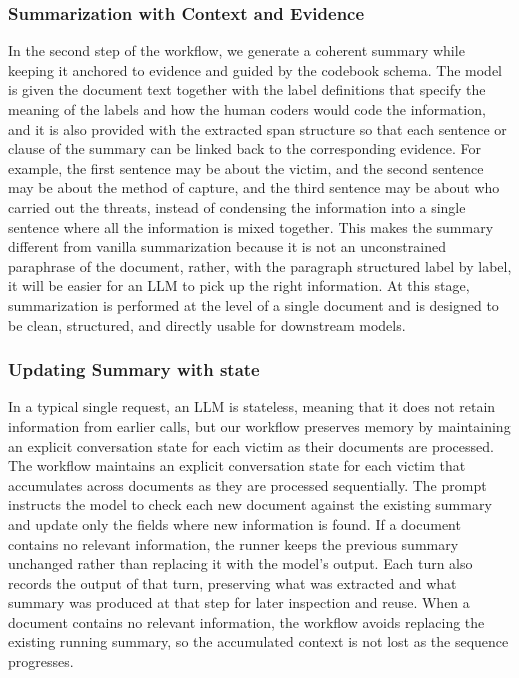 \documentclass{article}
\begin{document}
\subsubsection{Summarization with Context and
Evidence}\label{summarization-with-context-and-evidence}

In the second step of the workflow, we generate a coherent summary while
keeping it anchored to evidence and guided by the codebook schema. The
model is given the document text together with the label definitions
that specify the meaning of the labels and how the human coders would
code the information, and it is also provided with the extracted span
structure so that each sentence or clause of the summary can be linked
back to the corresponding evidence. For example, the first sentence may
be about the victim, and the second sentence may be about the method of
capture, and the third sentence may be about who carried out the
threats, instead of condensing the information into a single sentence
where all the information is mixed together. This makes the summary
different from vanilla summarization because it is not an unconstrained
paraphrase of the document, rather, with the paragraph structured label
by label, it will be easier for an LLM to pick up the right information.
At this stage, summarization is performed at the level of a single
document and is designed to be clean, structured, and directly usable
for downstream models.

\subsubsection{Updating Summary with
state}\label{updating-summary-with-state}

In a typical single request, an LLM is stateless, meaning that it does
not retain information from earlier calls, but our workflow preserves
memory by maintaining an explicit conversation state for each victim as
their documents are processed. The workflow maintains an explicit
conversation state for each victim that accumulates across documents as
they are processed sequentially. The prompt instructs the model to check
each new document against the existing summary and update only the
fields where new information is found. If a document contains no
relevant information, the runner keeps the previous summary unchanged
rather than replacing it with the model's output. Each turn also records
the output of that turn, preserving what was extracted and what summary
was produced at that step for later inspection and reuse. When a
document contains no relevant information, the workflow avoids replacing
the existing running summary, so the accumulated context is not lost as
the sequence progresses.
\end{document}
